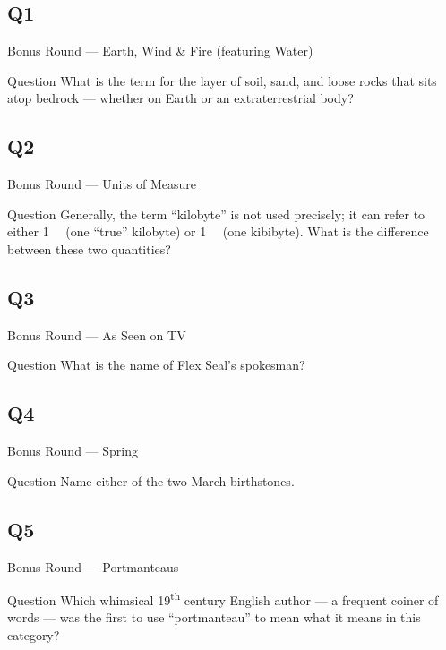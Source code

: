 \documentclass[11pt]{beamer}
\begin{document}
\subsection*{Q1}
\begin{frame}[t]{Bonus Round --- Earth, Wind \& Fire (featuring Water)}
\vspace{-0.5em}
\begin{block}{Question}
What is the term for the layer of soil, sand, and loose rocks that sits atop bedrock --- whether on Earth or an extraterrestrial body?
\end{block}
\end{frame}
\subsection*{Q2}
\begin{frame}[t]{Bonus Round --- Units of Measure}
\vspace{-0.5em}
\begin{block}{Question}
Generally, the term ``kilobyte'' is not used precisely; it can refer to either \SI{1}{\kilo\byte} (one ``true'' kilobyte) or \SI{1}{\kibi\byte} (one kibibyte). What is the difference between these two quantities?
\end{block}
\end{frame}
\subsection*{Q3}
\begin{frame}[t]{Bonus Round --- As Seen on TV}
\vspace{-0.5em}
\begin{block}{Question}
What is the name of Flex Seal's spokesman?
\end{block}
\end{frame}
\subsection*{Q4}
\begin{frame}[t]{Bonus Round --- Spring}
\vspace{-0.5em}
\begin{block}{Question}
Name either of the two March birthstones.
\end{block}
\end{frame}
\subsection*{Q5}
\begin{frame}[t]{Bonus Round --- Portmanteaus}
\vspace{-0.5em}
\begin{block}{Question}
Which whimsical 19\textsuperscript{th} century English author --- a frequent coiner of words --- was the first to use ``portmanteau'' to mean what it means in this category?
\end{block}
\end{frame}
\end{document}
